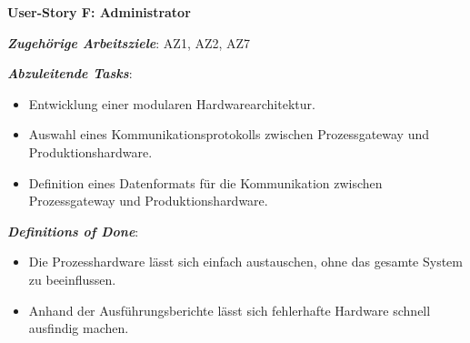 \noindent \textbf{User-Story F: Administrator}

\textbf{\textit{Zugehörige Arbeitsziele}}: AZ1, AZ2, AZ7

\textbf{\textit{Abzuleitende Tasks}}:

\begin{itemize}
    \item Entwicklung einer modularen Hardwarearchitektur.
    \item Auswahl eines Kommunikationsprotokolls zwischen Prozessgateway und Produktionshardware.
    \item Definition eines Datenformats für die Kommunikation zwischen Prozessgateway und Produktionshardware.
\end{itemize}

\textbf{\textit{Definitions of Done}}:

\begin{itemize}
    \item Die Prozesshardware lässt sich einfach austauschen, ohne das gesamte System zu beeinflussen.
    \item Anhand der Ausführungsberichte lässt sich fehlerhafte Hardware schnell ausfindig machen.
\end{itemize}